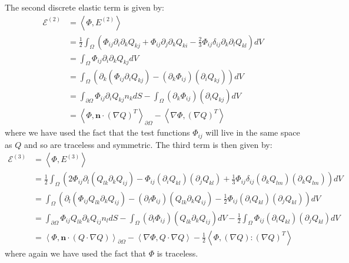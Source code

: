 \documentclass[reqno]{article}
\begin{document}
The second discrete elastic term is given by:
\begin{equation}
    \begin{split}
        \mathcal{E}^{(2)}
        &=
        \left< \Phi, E^{(2)} \right> \\
        &=
        \tfrac12 \int_\Omega \left( \Phi_{ij} \partial_i \partial_k Q_{kj}
        + \Phi_{ij} \partial_j \partial_k Q_{ki}
        - \tfrac23 \Phi_{ij} \delta_{ij} \partial_k \partial_l Q_{kl}
        \right) dV \\
        &=
        \int_\Omega \Phi_{ij} \partial_i \partial_k Q_{kj} dV \\
        &=
        \int_\Omega \left( \partial_k \left( \Phi_{ij} \partial_i Q_{kj} \right)
        - \left(\partial_k \Phi_{ij} \right) \left( \partial_i Q_{kj} \right) \right) dV \\
        &=
        \int_{\partial \Omega} \Phi_{ij} \partial_i Q_{kj} n_k dS
        - \int_\Omega (\partial_k \Phi_{ij}) (\partial_i Q_{kj}) dV \\
        &=
        \left< \Phi, \mathbf{n} \cdot \left(\nabla Q\right)^T \right>_{\partial \Omega}
        - \left< \nabla \Phi, \left(\nabla Q\right)^T \right> 
    \end{split}
\end{equation}
where we have used the fact that the test functions $\Phi_{ij}$ will live in the same space as $Q$ and so are traceless and symmetric.
The third term is then given by:
\begin{equation}
    \begin{split}
        \mathcal{E}^{(3)}
        &=
        \left< \Phi, E^{(3)} \right> \\
        &=
        \tfrac12 \int_\Omega \left( 2 \Phi_{ij} \partial_l (Q_{lk} \partial_k Q_{ij})
        - \Phi_{ij} (\partial_i Q_{kl}) (\partial_j Q_{kl})
        + \tfrac13 \Phi_{ij} \delta_{ij} (\partial_k Q_{lm}) (\partial_k Q_{lm})
        \right) dV \\
        &=
        \int_\Omega \left( \partial_l \left( \Phi_{ij} Q_{lk} \partial_k Q_{ij} \right)
        - (\partial_l \Phi_{ij}) (Q_{lk} \partial_k Q_{ij})
        - \tfrac12 \Phi_{ij} (\partial_i Q_{kl}) (\partial_j Q_{kl})
        \right) dV \\
        &=
        \int_{\partial \Omega}  \Phi_{ij} Q_{lk} \partial_k Q_{ij} n_l dS
        - \int_{\Omega} (\partial_l \Phi_{ij}) (Q_{lk} \partial_k Q_{ij}) dV
        - \tfrac12 \int_\Omega \Phi_{ij} (\partial_i Q_{kl}) (\partial_j Q_{kl}) dV \\
        &=
        \left< \Phi, \mathbf{n} \cdot \left( Q \cdot \nabla Q \right) \right>_{\partial \Omega}
        - \left< \nabla \Phi, Q \cdot \nabla Q \right>
        - \tfrac12 \left< \Phi, (\nabla Q) : (\nabla Q)^T \right>
    \end{split}
\end{equation}
where again we have used the fact that $\Phi$ is traceless.
\end{document}
